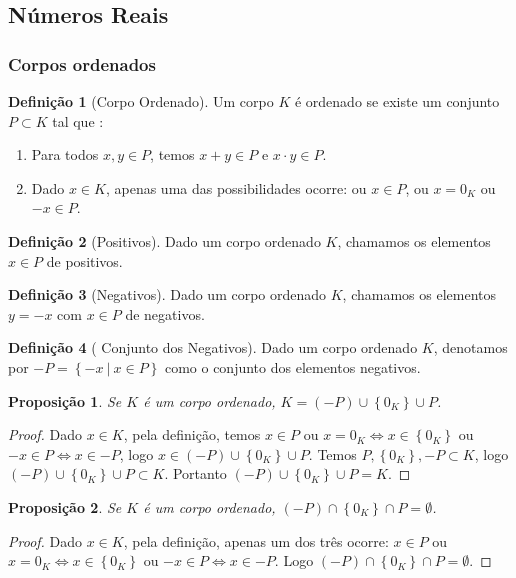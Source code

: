 \documentclass{article}
\newtheorem{prop}{Proposição}[section]
\theoremstyle{theorem}
\theoremstyle{lemma}
\theoremstyle{definition}
\newtheorem{definicao}{Definição}[section]
\theoremstyle{remark}
\begin{document}
\subsection{ Números Reais}
   \subsubsection{Corpos ordenados}
\begin{definicao}[Corpo Ordenado]
	Um corpo $K$ é ordenado se existe um conjunto $P\subset K$ tal que :
	\begin{enumerate}
		\item Para todos $x,y\in P$, temos $x+y\in P$ e $x\cdot y \in P$.
		\item Dado $x\in K$, apenas uma das possibilidades ocorre: ou $x \in P$, ou $x = 0_K $ ou $-x\in P$.
	\end{enumerate}
\end{definicao}
\begin{definicao}[Positivos]
	Dado um corpo ordenado $K$, chamamos os elementos $x\in P$ de positivos.
\end{definicao}
\begin{definicao}[Negativos]
	Dado um corpo ordenado $K$, chamamos os elementos $ y = -x$ com  $x\in P$ de negativos.
\end{definicao}
\begin{definicao}[ Conjunto dos Negativos]
	Dado um corpo ordenado $K$, denotamos por $-P = \left\{ -x \: | \: x\in P\right\}$ como o conjunto dos elementos negativos.
\end{definicao}
\begin{prop}
	Se $K$ é um corpo ordenado, $K = (-P) \cup \left\{ 0_K \right\} \cup P$.
\end{prop}
\begin{proof}
	Dado $x\in K$, pela definição, temos $x \in P$ ou $x = 0_K \iff x\in \left\{0_K\right\}$ ou $-x\in P \iff x \in -P$, logo $x\in (-P) \cup \left\{ 0_K \right\} \cup P$. Temos $P,\left\{0_K\right\}, -P \subset K$, logo $(-P) \cup \left\{ 0_K \right\} \cup P \subset K$. Portanto $(-P) \cup \left\{ 0_K \right\} \cup P = K$.
\end{proof}
\begin{prop}
	Se $K$ é um corpo ordenado, $(-P) \cap \left\{ 0_K \right\} \cap P = \emptyset$.
\end{prop}
\begin{proof}
	Dado $x\in K$, pela definição, apenas um dos três ocorre: $x \in P$ ou $x = 0_K \iff x\in \left\{0_K\right\}$ ou $-x\in P \iff x \in -P$. Logo $(-P) \cap \left\{ 0_K \right\} \cap P = \emptyset$.
\end{proof}
\end{document}
